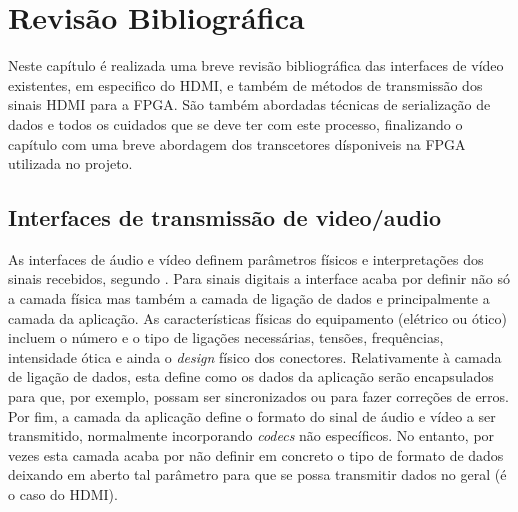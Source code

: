 
\chapter{Revisão Bibliográfica} \label{chap:chap2}

Neste capítulo é realizada uma breve revisão bibliográfica das interfaces de vídeo existentes, em especifico do HDMI, e também de métodos de transmissão dos sinais HDMI para a FPGA. São também abordadas técnicas de serialização de dados e todos os cuidados que se deve ter com este processo, finalizando o capítulo com uma breve abordagem dos transcetores dísponiveis na FPGA utilizada no projeto.

\section{Interfaces de transmissão de video/audio}

As interfaces de áudio e vídeo definem parâmetros físicos e interpretações dos sinais recebidos, segundo \cite{R004}. Para sinais digitais a interface acaba por definir não só a camada física mas também a camada de ligação de dados e principalmente a camada da aplicação. As características físicas do equipamento (elétrico ou ótico) incluem o número e o tipo de ligações necessárias, tensões, frequências, intensidade ótica e ainda o \textit{design} físico dos conectores. Relativamente à camada de ligação de dados, esta define como os dados da aplicação serão encapsulados para que, por exemplo, possam ser sincronizados ou para fazer correções de erros. Por fim, a camada da aplicação define o formato do sinal de áudio e vídeo a ser transmitido, normalmente incorporando \textit{codecs} não específicos. No entanto, por vezes esta camada acaba por não definir em concreto o tipo de formato de dados deixando em aberto tal parâmetro para que se possa transmitir dados no geral (é o caso do HDMI).

